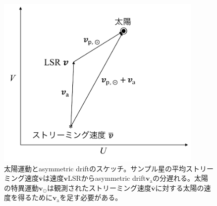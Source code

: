 \begin{figure}[htbp]
	\centering
	\includegraphics[width=10cm]{fig/various_velocities.pdf}
	\caption{太陽運動とasymmetric driftのスケッチ。サンプル星の平均ストリーミング速度$\pmb{\overline{v}}$は速度$\pmb{v}$LSRからasymmetric drift$\pmb{v}_{\mathrm{a}}$の分遅れる。太陽の特異運動$\pmb{v}_{\odot}$は観測されたストリーミング速度$\pmb{\overline{v}}$に対する太陽の速度を得るために$\pmb{v}_{\mathrm{a}}$を足す必要がある。}
	\label{fig1}
\end{figure}

